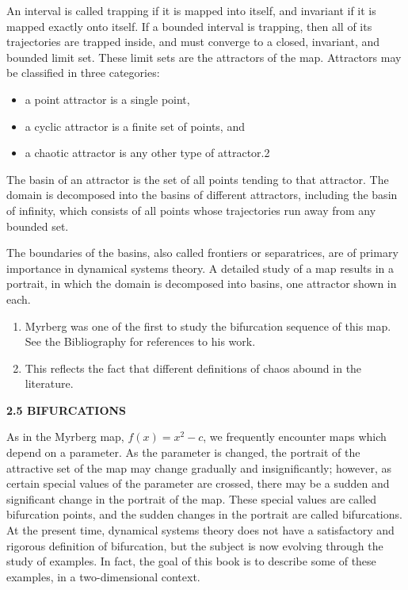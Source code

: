 \documentclass[12pt]{article}
\begin{document}
\hfill

An interval is called trapping if it is mapped into itself, and
invariant if it is mapped exactly onto itself. If a bounded interval is
trapping, then all of its trajectories are trapped inside, and must
converge to a closed, invariant, and bounded limit set. These limit
sets are the attractors of the map. Attractors may be classified in
three categories:

\begin{itemize}
\item a point attractor is a single point,
\item a cyclic attractor is a finite set of points, and
\item a chaotic attractor is any other type of attractor.2
\end{itemize}

The basin of an attractor is the set of all points tending to that
attractor. The domain is decomposed into the basins of different
attractors, including the basin of infinity, which consists of all
points whose trajectories run away from any bounded set.

\hfill

The boundaries of the basins, also called frontiers or separatrices,
are of primary importance in dynamical systems theory. A
detailed study of a map results in a portrait, in which the domain is
decomposed into basins, one attractor shown in each.

\begin{enumerate}
\item Myrberg was one of the first to study the bifurcation sequence of this map. See the Bibliography
for references to his work.
\item This reflects the fact that different definitions of chaos abound in the literature.
\end{enumerate}

\hfill

\textbf{2.5 BIFURCATIONS}

\hfill

As in the Myrberg map, $f(x) = x^2 - c$, we frequently encounter
maps which depend on a parameter. As the parameter is changed,
the portrait of the attractive set of the map may change gradually
and insignificantly; however, as certain special values of the parameter
are crossed, there may be a sudden and significant change in
the portrait of the map. These special values are called bifurcation
points, and the sudden changes in the portrait are called bifurcations.
At the present time, dynamical systems theory does not have
a satisfactory and rigorous definition of bifurcation, but the subject
is now evolving through the study of examples. In fact, the goal of
this book is to describe some of these examples, in a two-dimensional
context.
\end{document}
